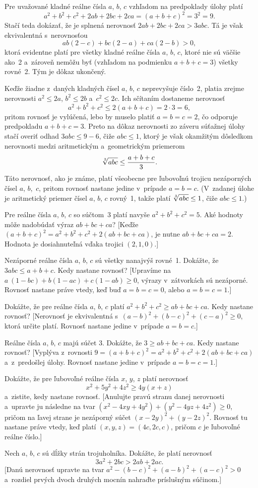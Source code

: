{%
Pre uvažované kladné reálne čísla $a$, $b$, $c$
vzhľadom na predpoklady úlohy platí
$$
a^2+b^2+c^2+2ab+2bc+2ca=(a+b+c)^2=3^2=9.
$$
Stačí teda dokázať, že je splnená nerovnosť $2ab+2bc+2ca>3abc$. Tá je
však ekvivalentná s~nerovnosťou
$$
ab(2-c)+bc(2-a)+ca(2-b)>0,
$$
ktorá evidentne platí pre všetky kladné reálne čísla $a$, $b$, $c$,
ktoré nie sú väčšie ako~2 a~zároveň nemôžu byť (vzhľadom na podmienku
$a+b+c=3$) všetky rovné~2. Tým je dôkaz ukončený.

\poznamka
Keďže žiadne z~daných kladných čísel $a$, $b$, $c$ neprevyšuje
číslo~2, platia zrejme nerovnosti $a^2\le 2a$, $b^2\le 2b$
a~$c^2\le 2c$. Ich sčítaním dostaneme nerovnosť
$$
a^2+b^2+c^2\le 2(a+b+c)=2\cdot3=6,
$$
pritom rovnosť je vylúčená, lebo by muselo platiť $a=b=c=2$,
čo odporuje predpokladu $a+b+c=3$. Preto na dôkaz nerovnosti zo
záveru súťažnej úlohy stačí
overiť odhad $3abc\le9-6$, čiže $abc\le1$,
ktorý je však okamžitým dôsledkom nerovnosti medzi
aritmetickým a~geometrickým priemerom
$$
\root{3}\of{abc}\le \frac{a+b+c}{3}.
$$
Táto nerovnosť, ako je známe, platí všeobecne pre ľubovoľnú trojicu nezáporných
čísel $a$, $b$,~$c$, pritom rovnosť nastane jedine v~prípade
$a=b=c$. (V~zadanej úlohe je aritmetický priemer čísel $a$,
$b$, $c$ rovný~1, takže platí $\root{3}\of{abc}\le1$, čiže
$abc\le1$.)

Pre reálne čísla $a$, $b$, $c$ so súčtom~3 platí navyše $a^2+b^2+
c^2 =5$. Aké hodnoty môže nadobúdať výraz $ab+bc+ca$?
[Keďže $(a+b+c)^2 = a^2+b^2+c^2+2 (ab+bc+ca)$, je nutne
$ab+bc+ca = 2$. Hodnota je dosiahnuteľná vďaka trojici $(2, 1, 0)$.]

Nezáporné reálne čísla $a$, $b$, $c$ sú všetky nanajvýš rovné~1. Dokážte,
že $3abc \le a+b+c$. Kedy nastane rovnosť?
[Upravíme na $a~(1-bc)+b (1-ac)+c (1-ab)\ge 0$,
výrazy v~zátvorkách sú nezáporné. Rovnosť nastane
práve vtedy, keď buď $a=b=c=0$, alebo $a=b=c=1$.]

\D
Dokážte, že pre reálne čísla $a$, $b$, $c$ platí $a^2+b^2+c^2\ge
ab+bc+ca$. Kedy nastane rovnosť?
[Nerovnosť je ekvivalentná s~$(a-b)^2 + (b-c)^2 + (c-a)^2 \ge 0$,
ktorá určite platí. Rovnosť nastane jedine v~prípade $a=b=c$.]

Reálne čísla $a$, $b$, $c$ majú súčet 3. Dokážte, že $3\ge ab+bc+ca$.
Kedy nastane rovnosť?
[Vyplýva z~rovnosti $9 = (a+b+c)^2 = a^2+b^2+c^2+2 (ab+bc+ca)$
a~z~predošlej úlohy. Rovnosť nastane jedine v~prípade $a=b=c=1$.]

Dokážte, že pre ľubovoľné reálne čísla $x$, $y$, $z$ platí
nerovnosť
$$x^2+5y^2+4z^2\ge 4y(x+z)$$
a~zistite, kedy nastane rovnosť.
[Anulujte pravú stranu danej nerovnosti a~upravte ju následne
na tvar $(x^2-4xy+4y^2)+(y^2-4yz+4z^2)\ge 0$, pričom na ľavej strane
je nezáporný súčet $(x-2y)^2+(y-2z)^2$. Rovnosť tu nastane
práve vtedy, keď platí $(x,y,z)=(4c,2c,c)$, pričom $c$ je ľubovoľné reálne
číslo.]

Nech $a$, $b$, $c$ sú dĺžky strán trojuholníka. Dokážte,
že platí nerovnosť
$$3a^2+2bc>2ab+2ac.$$
[Danú nerovnosť upravte na tvar
$a^2-(b-c)^2+(a-b)^2+(a-c)^2>0$
a~rozdiel prvých dvoch druhých mocnín nahraďte príslušným súčinom.]
}

